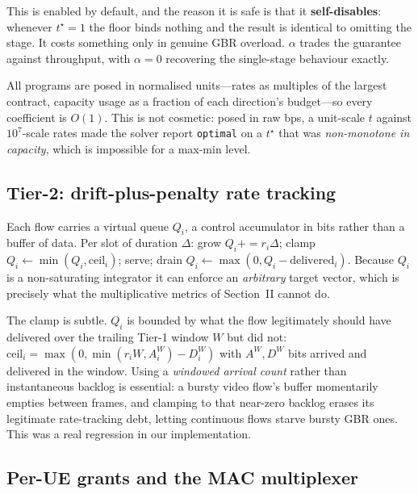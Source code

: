 \documentclass[conference]{IEEEtran}
\begin{document}
This is enabled by default, and the reason it is safe is that it
\textbf{self-disables}: whenever $t^\star = 1$ the floor binds nothing and
the result is identical to omitting the stage. It costs something only in
genuine GBR overload. $\alpha$ trades the guarantee against throughput,
with $\alpha = 0$ recovering the single-stage behaviour exactly.

All programs are posed in normalised units---rates as multiples of the
largest contract, capacity usage as a fraction of each direction's
budget---so every coefficient is $O(1)$. This is not cosmetic: posed in raw
bps, a unit-scale $t$ against $10^7$-scale rates made the solver report
\texttt{optimal} on a $t^\star$ that was \emph{non-monotone in capacity},
which is impossible for a max-min level.

\subsection{Tier-2: drift-plus-penalty rate tracking}

Each flow carries a virtual queue $Q_i$, a control accumulator in bits
rather than a buffer of data. Per slot of duration $\Delta$: grow
$Q_i \mathbin{+}= r_i\Delta$; clamp $Q_i \leftarrow \min(Q_i, \mathrm{ceil}_i)$;
serve; drain $Q_i \leftarrow \max(0, Q_i - \mathrm{delivered}_i)$. Because
$Q_i$ is a non-saturating integrator it can enforce an \emph{arbitrary}
target vector, which is precisely what the multiplicative metrics of
Section~II cannot do.

The clamp is subtle. $Q_i$ is bounded by what the flow legitimately should
have delivered over the trailing Tier-1 window $W$ but did not:
$\mathrm{ceil}_i = \max(0, \min(r_i W, A_i^W) - D_i^W)$ with $A^W, D^W$
bits arrived and delivered in the window. Using a \emph{windowed arrival
count} rather than instantaneous backlog is essential: a bursty video
flow's buffer momentarily empties between frames, and clamping to that
near-zero backlog erases its legitimate rate-tracking debt, letting
continuous flows starve bursty GBR ones. This was a real regression in our
implementation.

\subsection{Per-UE grants and the MAC multiplexer}
\end{document}
